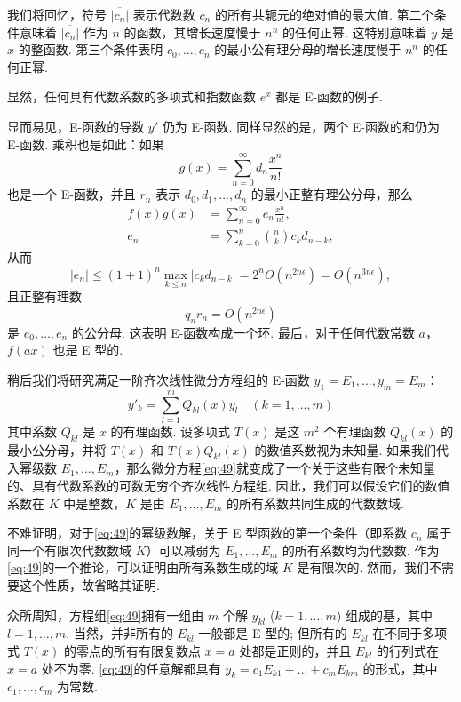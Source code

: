 我们将回忆，符号 $\overline{|c_n|}$ 表示代数数 $c_n$ 的所有共轭元的绝对值的最大值. 第二个条件意味着 $\overline{|c_n|}$ 作为 $n$ 的函数，其增长速度慢于 $n^n$ 的任何正幂. 这特别意味着 $y$ 是 $x$ 的整函数. 第三个条件表明 $c_0, \ldots, c_n$ 的最小公有理分母的增长速度慢于 $n^n$ 的任何正幂.

显然，任何具有代数系数的多项式和指数函数 $e^x$ 都是 E-函数的例子.

显而易见，E-函数的导数 $y'$ 仍为 E-函数. 同样显然的是，两个 E-函数的和仍为 E-函数. 乘积也是如此：如果
\[g(x) = \sum_{n=0}^{\infty} d_n \frac{x^n}{n!}\]
也是一个 E-函数，并且 $r_n$ 表示 $d_0, d_1, \ldots, d_n$ 的最小正整有理公分母，那么
\[
\begin{split} f(x)g(x) &= \sum_{n=0}^{\infty} e_n \frac{x^n}{n!}, \\ e_n &= \sum_{k=0}^{n} \binom{n}{k} c_k d_{n-k}, \end{split}
\]
从而
\[|e_n| \le (1+1)^n \max_{k \le n} \overline{|c_k d_{n-k}|} = 2^n O(n^{2n\epsilon}) = O(n^{3n\epsilon}),\]
且正整有理数
\[q_n r_n = O(n^{2n\epsilon})\]
是 $e_0, \ldots, e_n$ 的公分母. 这表明 E-函数构成一个环. 最后，对于任何代数常数 $a$，$f(ax)$ 也是 E 型的.

稍后我们将研究满足一阶齐次线性微分方程组的 E-函数 $y_1 = E_1, \ldots, y_m = E_m$：
\begin{equation}
y'_{k} = \sum_{l=1}^{m} Q_{kl}(x) y_{l} \quad (k=1,\ldots,m) \tag{49}\label{eq:49}
\end{equation}
其中系数 $Q_{kl}$ 是 $x$ 的有理函数. 设多项式 $T(x)$ 是这 $m^2$ 个有理函数 $Q_{kl}(x)$ 的最小公分母，并将 $T(x)$ 和 $T(x) Q_{kl}(x)$ 的数值系数视为未知量. 如果我们代入幂级数 $E_1, \ldots, E_m$，那么微分方程\eqref{eq:49}就变成了一个关于这些有限个未知量的、具有代数系数的可数无穷个齐次线性方程组. 因此，我们可以假设它们的数值系数在 $K$ 中是整数，$K$ 是由 $E_1, \ldots, E_m$ 的所有系数共同生成的代数数域.

不难证明，对于\eqref{eq:49}的幂级数解，关于 E 型函数的第一个条件（即系数 $c_n$ 属于同一个有限次代数数域 $K$）可以减弱为 $E_1, \ldots, E_m$ 的所有系数均为代数数. 作为\eqref{eq:49}的一个推论，可以证明由所有系数生成的域 $K$ 是有限次的. 然而，我们不需要这个性质，故省略其证明.

众所周知，方程组\eqref{eq:49}拥有一组由 $m$ 个解 $y_{kl}$ ($k=1,\ldots,m$) 组成的基，其中 $l=1,\dots,m$. 当然，并非所有的 $E_{kl}$ 一般都是 E 型的; 但所有的 $E_{kl}$ 在不同于多项式 $T(x)$ 的零点的所有有限复数点 $x=a$ 处都是正则的，并且 $E_{kl}$ 的行列式在 $x=a$ 处不为零. \eqref{eq:49}的任意解都具有 $y_k = c_1 E_{k1} + \dots + c_m E_{km}$ 的形式，其中 $c_1, \dots, c_m$ 为常数.

